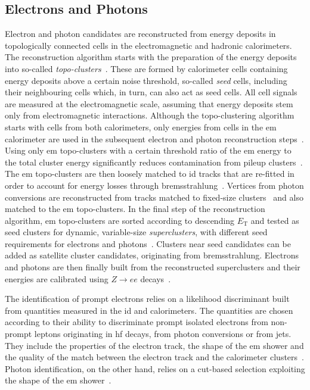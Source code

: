 \subsection{Electrons and Photons}\label{sec:reco_electrons}

Electron and photon candidates are reconstructed from energy deposits in topologically connected cells in the electromagnetic and hadronic calorimeters. The reconstruction algorithm starts with the preparation of the energy deposits into so-called \textit{topo-clusters}~\cite{PERF-2014-07}. These are formed by calorimeter cells containing energy deposits above a certain noise threshold, so-called \textit{seed} cells, including their neighbouring cells which, in turn, can also act as seed cells. All cell signals are measured at the electromagnetic scale, assuming that energy deposits stem only from electromagnetic interactions. Although the topo-clustering algorithm starts with cells from both calorimeters, only energies from cells in the \gls{em} calorimeter are used in the subsequent electron and photon reconstruction steps~\cite{EGAM-2018-01}. Using only \gls{em} topo-clusters with a certain threshold ratio of the \gls{em} energy to the total cluster energy significantly reduces contamination from pileup clusters~\cite{EGAM-2018-01}. The \gls{em} topo-clusters are then loosely matched to \gls{id} tracks that are re-fitted in order to account for energy losses through bremsstrahlung~\cite{EGAM-2018-01}. Vertices from photon conversions are reconstructed from tracks matched to fixed-size clusters~\cite{PERF-2017-02} and also matched to the \gls{em} topo-clusters. In the final step of the reconstruction algorithm, \gls{em} topo-clusters are sorted according to descending $E_{\mathrm{T}}$ and tested as seed clusters for dynamic, variable-size \textit{superclusters}, with different seed requirements for electrons and photons~\cite{EGAM-2018-01}. Clusters near seed candidates can be added as satellite cluster candidates, originating \eg from bremsstrahlung. Electrons and photons are then finally built from the reconstructed superclusters and their energies are calibrated using $Z\rightarrow ee$ decays~\cite{EGAM-2018-01}.

The identification of prompt electrons relies on a likelihood discriminant built from quantities measured in the \gls{id} and calorimeters. The quantities are chosen according to their ability to discriminate prompt isolated electrons from non-prompt leptons originating in \eg \gls{hf} decays, from photon conversions or from jets. They include the properties of the electron track, the shape of the \gls{em} shower and the quality of the match between the electron track and the calorimeter clusters~\cite{PERF-2017-01}. Photon identification, on the other hand, relies on a cut-based selection exploiting the shape of the \gls{em} shower~\cite{EGAM-2018-01}.

